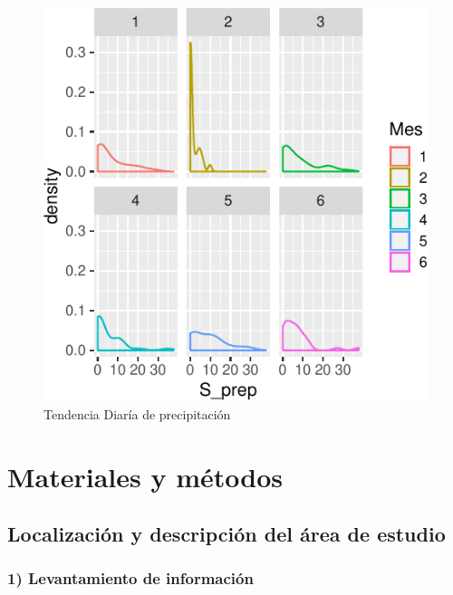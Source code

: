 \documentclass[letterpaper,9pt,twocolumn,twoside,]{pinp}
\begin{document}
\begin{figure}

{\centering \includegraphics{report_hidrolgy_files/figure-latex/unnamed-chunk-2-1} 

}

\caption{Tendencia Diaría de precipitación}\label{fig:unnamed-chunk-2}
\end{figure}

\hypertarget{materiales-y-muxe9todos}{%
\section{Materiales y métodos}\label{materiales-y-muxe9todos}}

\hypertarget{localizaciuxf3n-y-descripciuxf3n-del-uxe1rea-de-estudio}{%
\subsection{Localización y descripción del área de
estudio}\label{localizaciuxf3n-y-descripciuxf3n-del-uxe1rea-de-estudio}}

\hypertarget{levantamiento-de-informaciuxf3n}{%
\subsubsection{1) Levantamiento de
información}\label{levantamiento-de-informaciuxf3n}}
\end{document}
